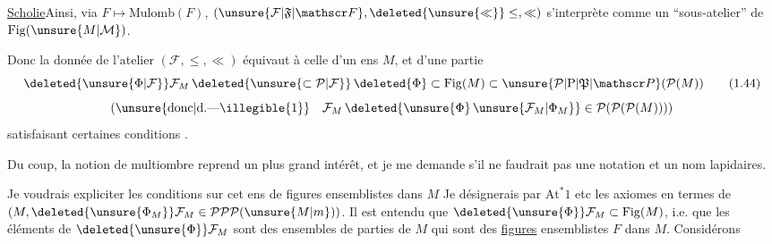 \uline{Scholie}\quad Ainsi, via $F\longmapsto\mathrm{Mulomb}(F)$,
$(\unsure{\mathcal F|\mathfrak F|\mathscr F},\deleted{\unsure{\ll}}\leq,\ll)$ s'interprète comme un ``sous-atelier'' de $\mathrm{Fig}(\unsure{M|\mathcal M})$.

Donc la donnée de l'atelier $(\mathcal F,\leq,\ll)$ équivaut à celle d'un ens $M$, et d'une partie
\[
 \deleted{\unsure{\Phi|\mathcal F}}\mathcal F_M\,
 \deleted{\unsure{\subset\mathcal P|\mathcal F}}\,
 \deleted{\Phi}\subset\mathrm{Fig}(M)\subset
 \unsure{\mathcal P|\mathrm P|\mathfrak P|\mathscr P}(\mathcal P(M))
 \tag*{(1.44)}
\]
\[
 \left(\text{\unsure{donc|d.---\illegible{1}}}\quad
 \mathcal F_M\,\deleted{\unsure{\Phi}\,\unsure{\mathcal F_M|\Phi_M}}
 \in\mathcal P(\mathcal P(\mathcal P(M)))\right)
\]
satisfaisant certaines conditions .

Du coup, la notion de  multiombre reprend un plus grand intérêt, et je me demande s'il ne faudrait pas une notation  et un nom  lapidaires.

Je voudrais expliciter les conditions sur cet ens de figures ensemblistes dans $M$ Je désignerais par $\mathrm{At}^{*}1$ etc les axiomes en termes de $(M,\deleted{\unsure{\Phi_M}}\mathcal F_M\in\mathcal P\mathcal P\mathcal P(\unsure{M|m}))$.
 Il est entendu que $\deleted{\unsure{\Phi}}\mathcal F_M\subset\mathrm{Fig}(M)$, i.e.  que les éléments de $\deleted{\unsure{\Phi}}\mathcal F_M$ sont des ensembles de parties de $M$ qui sont des \uline{figures} ensemblistes $F$ dans $M$.   Considérons
